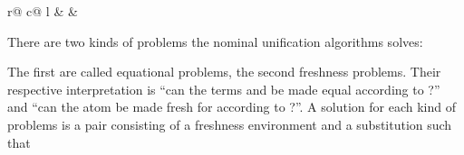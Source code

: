 \begin{isabellebody}
\begin{isamarkuptext}
\begin{center}
\begin{tabular}{r@ {\hspace{2mm}}c@ {\hspace{2mm}}l}
   &  & 
  \end{tabular}
  \end{center}

  \noindent
  There are two kinds of problems the nominal unification algorithms solves:

  \begin{center}
   \hspace{10mm} 
  \end{center}

  \noindent
  The first are called equational problems, the second freshness problems.
  Their respective interpretation is ``can the terms  and  be made
  equal according to ?'' and ``can the atom  be made fresh for
   according to ?''. A solution for each kind of problems is a pair  
  consisting of a freshness environment and a substitution such that

  \begin{center}
   \hspace{10mm} 
  \end{center}


\end{isamarkuptext}
\end{isabellebody}
